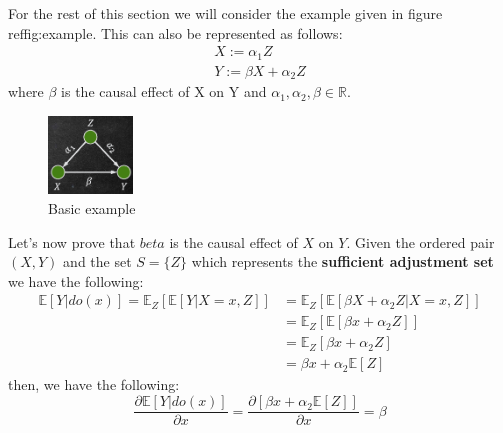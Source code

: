 For the rest of this section we will consider the example given in figure ref{fig:example}. This can also be represented as follows:
\begin{equation}
    \begin{array}{l}
         X := \alpha_1 Z \\ Y := \beta X + \alpha_2 Z 
    \end{array}
\end{equation}
where $\beta$ is the causal effect of X on Y and $\alpha_1, \alpha_2, \beta\in \mathbb{R}$.

\begin{figure}[!ht]
    \centering
    \includegraphics[width=0.2\textwidth]{img/example.png}
    \caption{Basic example}
    \label{fig:example}
\end{figure}

Let’s now prove that $ beta$ is the causal effect of $X$ on $Y$. Given the ordered 
pair $(X, Y)$ and the set $S  = \{Z \}$ which represents the \textbf{sufficient 
adjustment set} we have the following:
\begin{equation} 
    \begin{array}{ll}
         \mathbb{E}[Y | do(x)] = \mathbb{E}_Z[\mathbb{E}[Y | X = x, Z]] & = \mathbb{E}_Z[\mathbb{E}[\beta X + \alpha_2 Z | X = x, Z]] \\
         & = \mathbb{E}_Z[\mathbb{E}[\beta x + \alpha_2 Z]]\\
         & = \mathbb{E}_Z[\beta x + \alpha_2 Z] \\
         & = \beta x + \alpha_2\mathbb{E}[Z]
    \end{array}
\end{equation}
then, we have the following:
\begin{equation}
    \frac{\partial \mathbb{E}[Y |do(x)]}{\partial x} = \frac{\partial [\beta x + \alpha_2\mathbb{E}[Z]]}{\partial x} = \beta
\end{equation}

